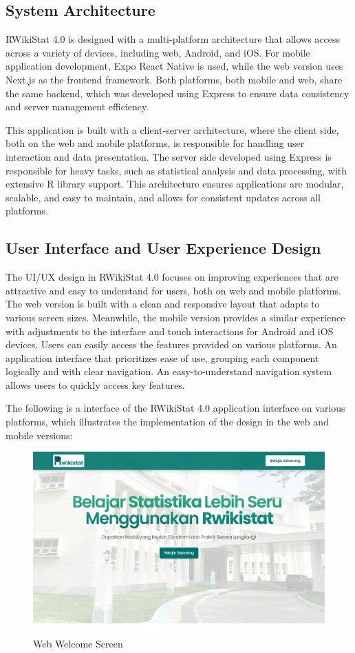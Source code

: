 \documentclass[conference,a4paper]{IEEEtran}
\begin{document}
\subsection{System Architecture}
RWikiStat 4.0 is designed with a multi-platform architecture that allows access
across a variety of devices, including web, Android, and iOS. For mobile
application development, Expo React Native is used, while the web version uses
Next.js as the frontend framework. Both platforms, both mobile and web, share
the same backend, which was developed using Express to ensure data consistency
and server management efficiency.

This application is built with a client-server architecture, where the client
side, both on the web and mobile platforms, is responsible for handling user
interaction and data presentation. The server side developed using Express is
responsible for heavy tasks, such as statistical analysis and data processing,
with extensive R library support. This architecture ensures applications are
modular, scalable, and easy to maintain, and allows for consistent updates
across all platforms.

\subsection{User Interface and User Experience Design}
The UI/UX design in RWikiStat 4.0 focuses on improving experiences that are
attractive and easy to understand for users, both on web and mobile platforms.
The web version is built with a clean and responsive layout that adapts to
various screen sizes. Meanwhile, the mobile version provides a similar
experience with adjustments to the interface and touch interactions for Android
and iOS devices. Users can easily access the features provided on various
platforms. An application interface that prioritizes ease of use, grouping each
component logically and with clear navigation. An easy-to-understand navigation
system allows users to quickly access key features.

The following is a interface of the RWikiStat 4.0 application interface on
various platforms, which illustrates the implementation of the design in the
web and mobile versions:

\begin{figure}[htb]
  \centering
  \includegraphics [width=8.5 cm, height=6 cm]{images/web-welcome}
  \caption{Web Welcome Screen}
  \label{distribution}
\end{figure}
\end{document}
